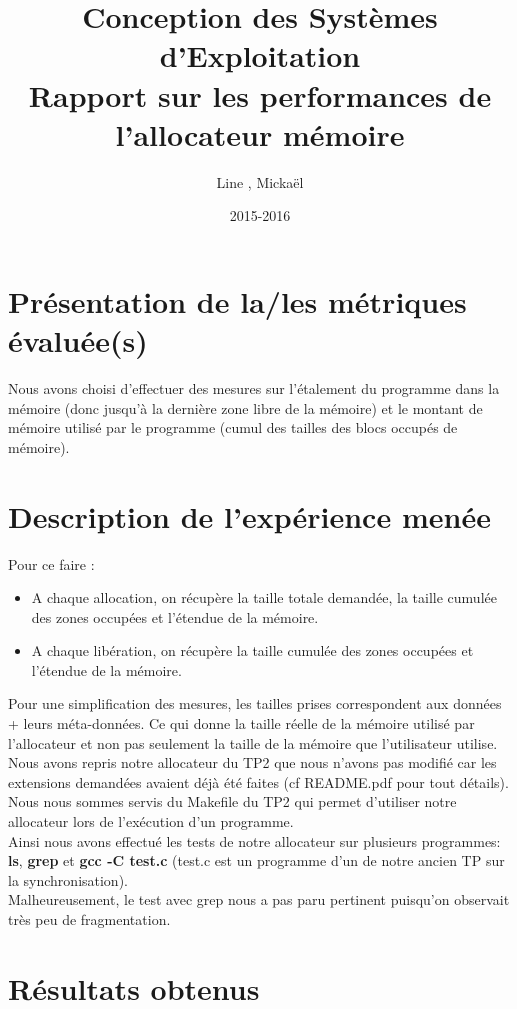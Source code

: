 \documentclass{article}
\title{Conception des Systèmes d'Exploitation\\Rapport sur les performances de l'allocateur mémoire}
\author{Line \bsc{POUVARET}, Mickaël \bsc{TURNEL}}
\date{2015-2016}
\begin{document}
\maketitle
\section{Présentation de la/les métriques évaluée(s)}
Nous avons choisi d'effectuer des mesures sur l'étalement du programme dans la mémoire (donc jusqu'à la dernière zone libre de la mémoire) et le montant de mémoire utilisé par le programme (cumul des tailles des blocs occupés de mémoire).

\section{Description de l'expérience menée}
Pour ce faire :
\begin{itemize}
\item A chaque allocation, on récupère la taille totale demandée, la taille cumulée des zones occupées et l'étendue de la mémoire.

\item A chaque libération, on récupère la taille cumulée des zones occupées et l'étendue de la mémoire.
\end{itemize}

Pour une simplification des mesures, les tailles prises correspondent aux données + leurs méta-données. Ce qui donne la taille réelle de la mémoire utilisé par l'allocateur et non pas seulement la taille de la mémoire que l'utilisateur utilise.\\

Nous avons repris notre allocateur du TP2 que nous n'avons pas modifié car les extensions demandées avaient déjà été faites (cf README.pdf pour tout détails). Nous nous sommes servis du Makefile du TP2 qui permet d'utiliser notre allocateur lors de l'exécution d'un programme.\\

Ainsi nous avons effectué les tests de notre allocateur sur plusieurs programmes: \textbf{ls}, \textbf{grep} et \textbf{gcc -C test.c} (test.c est un programme d'un de notre ancien TP sur la synchronisation).\\

Malheureusement, le test avec grep nous a pas paru pertinent puisqu'on observait très peu de fragmentation.

\section{Résultats obtenus}
\end{document}
